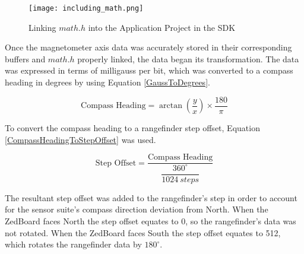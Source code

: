 \begin{figure}[H]
	\centerline{\texttt{[image: including\_math.png]}}
	\caption{Linking $math.h$ into the Application Project in the SDK}
	\label{including_math}
\end{figure}

Once the magnetometer axis data was accurately stored in their corresponding buffers and $math.h$ properly linked, the data began its transformation. The data was expressed in terms of milligauss per bit, which was converted to a compass heading in degrees by using Equation \ref{GaussToDegrees}.

\begin{equation}
	\textrm{Compass Heading} = \arctan(\dfrac{y}{x})\times\dfrac{180}{\pi}
	\label{GaussToDegrees}
\end{equation}

To convert the compass heading to a rangefinder step offset, Equation \ref{CompassHeadingToStepOffset} was used.

\begin{equation}
	\textrm{Step Offset} = \dfrac{\textrm{Compass Heading}}{\dfrac{360^\circ}{1024\ steps}}
	\label{CompassHeadingToStepOffset}
\end{equation}

The resultant step offset was added to the rangefinder's step in order to account for the sensor suite's compass direction deviation from North. When the ZedBoard faces North the step offset equates to 0, so the rangefinder's data was not rotated. When the ZedBoard faces South the step offset equates to 512, which rotates the rangefinder data by $180^\circ$.






